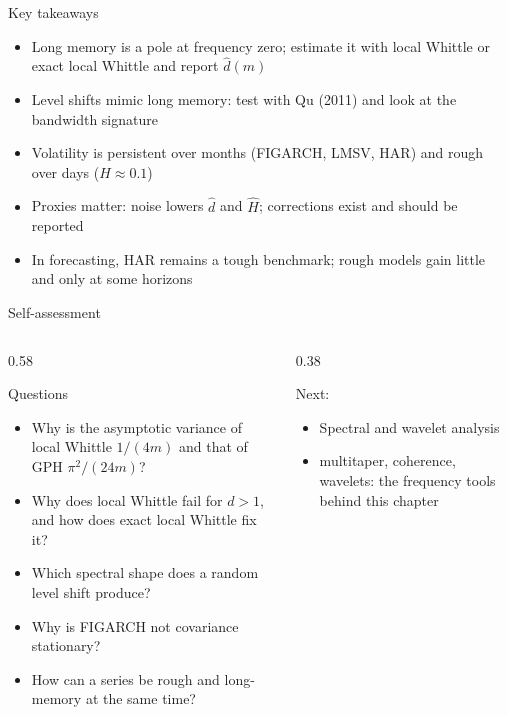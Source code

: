 \begin{frame}{Key takeaways}
\itemsize{\small}
\begin{itemize}
    \item Long memory is a pole at frequency zero; estimate it with local Whittle or exact local Whittle and report $\hat d(m)$
    \item Level shifts mimic long memory: test with Qu (2011) and look at the bandwidth signature
    \item Volatility is persistent over months (FIGARCH, LMSV, HAR) and rough over days ($H \approx 0.1$)
    \item Proxies matter: noise lowers $\hat d$ and $\hat H$; corrections exist and should be reported
    \item In forecasting, HAR remains a tough benchmark; rough models gain little and only at some horizons
\end{itemize}
\end{frame}

\begin{frame}{Self-assessment}
\itemsize{\small}
\begin{columns}[T]
\begin{column}{0.58\textwidth}
\begin{block}{Questions}
\begin{itemize}
    \item Why is the asymptotic variance of local Whittle $1/(4m)$ and that of GPH $\pi^2/(24m)$?
    \item Why does local Whittle fail for $d > 1$, and how does exact local Whittle fix it?
    \item Which spectral shape does a random level shift produce?
    \item Why is FIGARCH not covariance stationary?
    \item How can a series be rough and long-memory at the same time?
\end{itemize}
\end{block}
\end{column}
\begin{column}{0.38\textwidth}
\begin{block}{Next: }
\begin{itemize}
    \item Spectral and wavelet analysis
    \item multitaper, coherence, wavelets: the frequency tools behind this chapter
\end{itemize}
\end{block}
\end{column}
\end{columns}
\end{frame}


